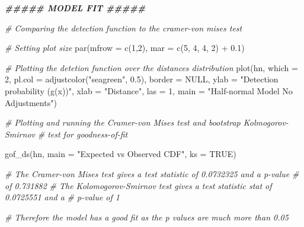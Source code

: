 \documentclass[
  12pt,
]{article}
\newenvironment{Shaded}{\begin{snugshade}}{\end{snugshade}}
\newcommand{\AttributeTok}[1]{\textcolor[rgb]{0.77,0.63,0.00}{#1}}
\newcommand{\CommentTok}[1]{\textcolor[rgb]{0.56,0.35,0.01}{\textit{#1}}}
\newcommand{\ConstantTok}[1]{\textcolor[rgb]{0.00,0.00,0.00}{#1}}
\newcommand{\DecValTok}[1]{\textcolor[rgb]{0.00,0.00,0.81}{#1}}
\newcommand{\DocumentationTok}[1]{\textcolor[rgb]{0.56,0.35,0.01}{\textbf{\textit{#1}}}}
\newcommand{\FloatTok}[1]{\textcolor[rgb]{0.00,0.00,0.81}{#1}}
\newcommand{\FunctionTok}[1]{\textcolor[rgb]{0.00,0.00,0.00}{#1}}
\newcommand{\NormalTok}[1]{#1}
\newcommand{\SpecialCharTok}[1]{\textcolor[rgb]{0.00,0.00,0.00}{#1}}
\newcommand{\StringTok}[1]{\textcolor[rgb]{0.31,0.60,0.02}{#1}}
\begin{document}
\begin{Shaded}
\begin{Highlighting}[]
\DocumentationTok{\#\#\#\#\#     MODEL FIT     \#\#\#\#\#}

\CommentTok{\# Comparing the detection function to the cramer{-}von mises test}

\CommentTok{\# Setting plot size}
\FunctionTok{par}\NormalTok{(}\AttributeTok{mfrow =} \FunctionTok{c}\NormalTok{(}\DecValTok{1}\NormalTok{,}\DecValTok{2}\NormalTok{), }\AttributeTok{mar =} \FunctionTok{c}\NormalTok{(}\DecValTok{5}\NormalTok{, }\DecValTok{4}\NormalTok{, }\DecValTok{4}\NormalTok{, }\DecValTok{2}\NormalTok{) }\SpecialCharTok{+} \FloatTok{0.1}\NormalTok{)}

\CommentTok{\# Plotting the detetion function over the distances distribution}
\FunctionTok{plot}\NormalTok{(hn, }
     \AttributeTok{which =} \DecValTok{2}\NormalTok{, }
     \AttributeTok{pl.col =} \FunctionTok{adjustcolor}\NormalTok{(}\StringTok{"seagreen"}\NormalTok{, }\FloatTok{0.5}\NormalTok{), }
     \AttributeTok{border =} \ConstantTok{NULL}\NormalTok{,}
     \AttributeTok{ylab =} \StringTok{"Detection probability (g(x))"}\NormalTok{, }
     \AttributeTok{xlab =} \StringTok{"Distance"}\NormalTok{, }
     \AttributeTok{las =} \DecValTok{1}\NormalTok{,}
     \AttributeTok{main =} \StringTok{"Half{-}normal Model No Adjustments"}\NormalTok{)}

\CommentTok{\# Plotting and running the Cramer{-}von Mises test and bootstrap Kolmogorov{-}Smirnov      }
\CommentTok{\#   test for goodness{-}of{-}fit}

\FunctionTok{gof\_ds}\NormalTok{(hn, }\AttributeTok{main =} \StringTok{"Expected vs Observed CDF"}\NormalTok{, }\AttributeTok{ks =} \ConstantTok{TRUE}\NormalTok{)}

  \CommentTok{\# The Cramer{-}von Mises test gives a test statistic of 0.0732325 and a p{-}value }
  \CommentTok{\#   of 0.731882}
  \CommentTok{\# The Kolomogorov{-}Smirnov test gives a test statistic stat of 0.0725551 and a             }
  \CommentTok{\#   p{-}value of 1}

\CommentTok{\# Therefore the model has a good fit as the p values are much more than 0.05}
\end{Highlighting}
\end{Shaded}
\end{document}
